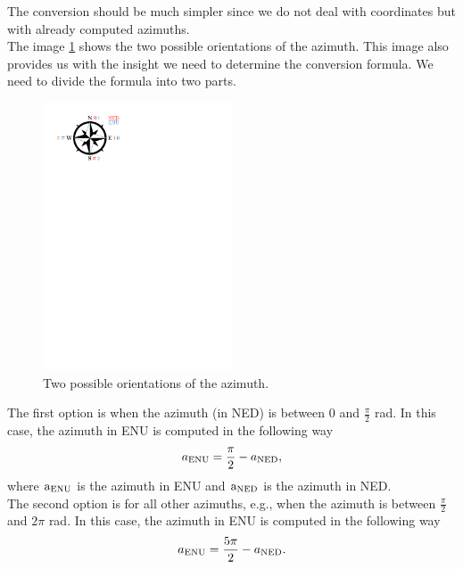             The conversion should be much simpler since we do not deal with coordinates but with already computed azimuths.\\
            The image \ref{fig:dir_indi} shows the two possible orientations of the azimuth. This image also provides us with the insight we need to determine the conversion formula. We need to divide the formula into two parts.\\
            \begin{figure}[ht]
                \centering
                \includegraphics[width=0.5\textwidth]{images/direction_indicator.pdf}
                \caption{Two possible orientations of the azimuth.}
                \label{fig:dir_indi}
            \end{figure}
            \noindent The first option is when the azimuth (in NED) is between 0 and $\frac{\pi}{2}$ rad. In this case, the azimuth in ENU is computed in the following way
            \begin{equation}
                a_{\rm{ENU}} = \frac{\pi}{2} - a_{\rm{NED}},
            \end{equation}
            where $\text{a}_{\rm{ENU}}$ is the azimuth in ENU and $\text{a}_{\rm{NED}}$ is the azimuth in NED.\\
            The second option is for all other azimuths, e.g., when the azimuth is between $\frac{\pi}{2}$ and $2\pi$ rad. In this case, the azimuth in ENU is computed in the following way
            \begin{equation}
                a_{\rm{ENU}} = \frac{5\pi}{2} - a_{\rm{NED}}.
            \end{equation}\\
